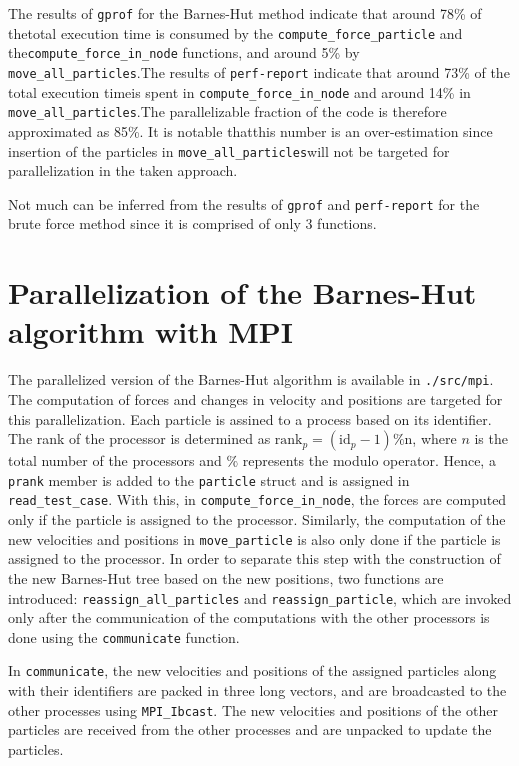\documentclass[10pt,journal,compsocconf]{IEEEtran}
\begin{document}
The results of \texttt{gprof} for the Barnes-Hut method indicate that around 78\% of thetotal execution time is consumed by the \texttt{compute\_force\_particle} and the\texttt{compute\_force\_in\_node} functions, and around 5\% by \texttt{move\_all\_particles}.The results of \texttt{perf-report} indicate that around 73\% of the total execution timeis spent in \texttt{compute\_force\_in\_node} and around 14\% in \texttt{move\_all\_particles}.The parallelizable fraction of the code is therefore approximated as 85\%. It is notable thatthis number is an over-estimation since insertion of the particles in \texttt{move\_all\_particles}will not be targeted for parallelization in the taken approach.

Not much can be inferred from the results of \texttt{gprof} and \texttt{perf-report} for the brute force method since it is comprised of only 3 functions.

\section{Parallelization of the Barnes-Hut algorithm with MPI}

The parallelized version of the Barnes-Hut algorithm is available in \texttt{./src/mpi}. The computation of forces and changes in velocity and positions are targeted for this parallelization. Each particle is assined to a process based on its identifier. The rank of the processor is determined as $\text{rank}_p = (\text{id}_p - 1) \% \text{n}$, where $n$ is the total number of the processors and $\%$ represents the modulo operator. Hence, a \texttt{prank} member is added to the \texttt{particle} struct and is assigned in \texttt{read\_test\_case}. With this, in \texttt{compute\_force\_in\_node}, the forces are computed only if the particle is assigned to the processor. Similarly, the computation of the new velocities and positions in \texttt{move\_particle} is also only done if the particle is assigned to the processor. In order to separate this step with the construction of the new Barnes-Hut tree based on the new positions, two functions are introduced: \texttt{reassign\_all\_particles} and \texttt{reassign\_particle}, which are invoked only after the communication of the computations with the other processors is done using the \texttt{communicate} function.

In \texttt{communicate}, the new velocities and positions of the assigned particles along with their identifiers are packed in three long vectors, and are broadcasted to the other processes using \texttt{MPI\_Ibcast}. The new velocities and positions of the other particles are received from the other processes and are unpacked to update the particles.
\end{document}
